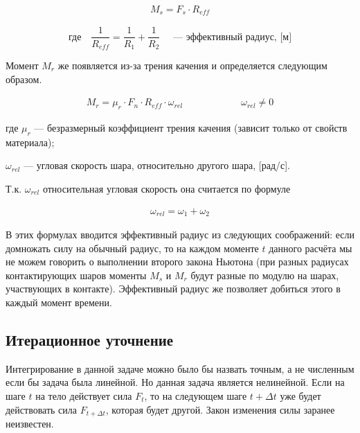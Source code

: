 \documentclass[a4paper]{article}
\begin{document}
\begin{align}
\label{sliding_moment}
M_s = F_s \cdot R_{eff}
\end{align}

\[
\text{где} \quad \dfrac{1}{R_{eff}} = \dfrac{1}{R_1} + \dfrac{1}{R_2} \quad \text{ --- эффективный радиус, [м]}
\]

Момент $M_r$ же появляется из-за трения качения и определяется следующим образом.

\begin{align}
\label{rolling_moment}
M_r = \mu_r \cdot F_n \cdot R_{eff} \cdot \omega_{rel} \qquad \qquad \qquad \omega_{rel} \neq 0
\end{align}

где $\mu_r$ --- безразмерный коэффициент трения качения (зависит только от свойств материала);

$\omega_{rel}$ --- угловая скорость шара, относительно другого шара, [рад/с].

Т.к. $\omega_{rel}$ относительная угловая скорость она считается по формуле 

\begin{align*}
\omega_{rel} = \omega_1 + \omega_2
\end{align*}

В этих формулах вводится эффективный радиус из следующих соображений: если домножать силу на обычный радиус, то на каждом моменте $t$ данного расчёта мы не можем говорить о выполнении второго закона Ньютона (при разных радиусах контактирующих шаров моменты $M_s$ и $M_r$ будут разные по модулю на шарах, участвующих в контакте).
Эффективный радиус же позволяет добиться этого в каждый момент времени.





 
\subsection{Итерационное уточнение}
\label{iter_subsection}


Интегрирование в данной задаче можно было бы назвать точным, а не численным если бы задача была линейной.
Но данная задача является нелинейной. Если на шаге $t$ на тело действует сила $F_t$, то на следующем шаге $t + \Delta t$ уже будет действовать сила $F_{t + \Delta t}$, которая будет другой. 
Закон изменения силы заранее неизвестен.
\end{document}

